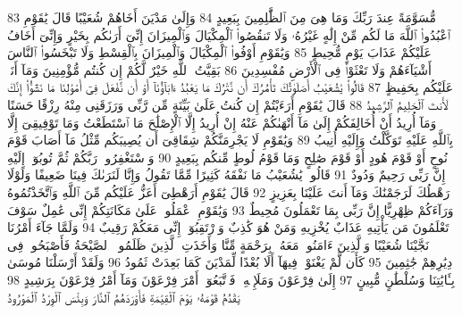 {\tiny\colorbox{cl_aya}{83}} مُّسَوَّمَةً عِندَ رَبِّكَ وَمَا هِىَ مِنَ ٱلظَّٰلِمِينَ بِبَعِيدٍ
{\tiny\colorbox{cl_aya}{84}} وَإِلَىٰ مَدْيَنَ أَخَاهُمْ شُعَيْبًا قَالَ يَٰقَوْمِ ٱعْبُدُوا۟ ٱللَّهَ مَا لَكُم مِّنْ إِلَٰهٍ غَيْرُهُۥ وَلَا تَنقُصُوا۟ ٱلْمِكْيَالَ وَٱلْمِيزَانَ إِنِّىٓ أَرَىٰكُم بِخَيْرٍ وَإِنِّىٓ أَخَافُ عَلَيْكُمْ عَذَابَ يَوْمٍ مُّحِيطٍ
{\tiny\colorbox{cl_aya}{85}} وَيَٰقَوْمِ أَوْفُوا۟ ٱلْمِكْيَالَ وَٱلْمِيزَانَ بِٱلْقِسْطِ وَلَا تَبْخَسُوا۟ ٱلنَّاسَ أَشْيَآءَهُمْ وَلَا تَعْثَوْا۟ فِى ٱلْأَرْضِ مُفْسِدِينَ
{\tiny\colorbox{cl_aya}{86}} بَقِيَّتُ ٱللَّهِ خَيْرٌ لَّكُمْ إِن كُنتُم مُّؤْمِنِينَ وَمَآ أَنَا۠ عَلَيْكُم بِحَفِيظٍ
{\tiny\colorbox{cl_aya}{87}} قَالُوا۟ يَٰشُعَيْبُ أَصَلَوٰتُكَ تَأْمُرُكَ أَن نَّتْرُكَ مَا يَعْبُدُ ءَابَآؤُنَآ أَوْ أَن نَّفْعَلَ فِىٓ أَمْوَٰلِنَا مَا نَشَٰٓؤُا۟ إِنَّكَ لَأَنتَ ٱلْحَلِيمُ ٱلرَّشِيدُ
{\tiny\colorbox{cl_aya}{88}} قَالَ يَٰقَوْمِ أَرَءَيْتُمْ إِن كُنتُ عَلَىٰ بَيِّنَةٍ مِّن رَّبِّى وَرَزَقَنِى مِنْهُ رِزْقًا حَسَنًا وَمَآ أُرِيدُ أَنْ أُخَالِفَكُمْ إِلَىٰ مَآ أَنْهَىٰكُمْ عَنْهُ إِنْ أُرِيدُ إِلَّا ٱلْإِصْلَٰحَ مَا ٱسْتَطَعْتُ وَمَا تَوْفِيقِىٓ إِلَّا بِٱللَّهِ عَلَيْهِ تَوَكَّلْتُ وَإِلَيْهِ أُنِيبُ
{\tiny\colorbox{cl_aya}{89}} وَيَٰقَوْمِ لَا يَجْرِمَنَّكُمْ شِقَاقِىٓ أَن يُصِيبَكُم مِّثْلُ مَآ أَصَابَ قَوْمَ نُوحٍ أَوْ قَوْمَ هُودٍ أَوْ قَوْمَ صَٰلِحٍ وَمَا قَوْمُ لُوطٍ مِّنكُم بِبَعِيدٍ
{\tiny\colorbox{cl_aya}{90}} وَٱسْتَغْفِرُوا۟ رَبَّكُمْ ثُمَّ تُوبُوٓا۟ إِلَيْهِ إِنَّ رَبِّى رَحِيمٌ وَدُودٌ
{\tiny\colorbox{cl_aya}{91}} قَالُوا۟ يَٰشُعَيْبُ مَا نَفْقَهُ كَثِيرًا مِّمَّا تَقُولُ وَإِنَّا لَنَرَىٰكَ فِينَا ضَعِيفًا وَلَوْلَا رَهْطُكَ لَرَجَمْنَٰكَ وَمَآ أَنتَ عَلَيْنَا بِعَزِيزٍ
{\tiny\colorbox{cl_aya}{92}} قَالَ يَٰقَوْمِ أَرَهْطِىٓ أَعَزُّ عَلَيْكُم مِّنَ ٱللَّهِ وَٱتَّخَذْتُمُوهُ وَرَآءَكُمْ ظِهْرِيًّا إِنَّ رَبِّى بِمَا تَعْمَلُونَ مُحِيطٌ
{\tiny\colorbox{cl_aya}{93}} وَيَٰقَوْمِ ٱعْمَلُوا۟ عَلَىٰ مَكَانَتِكُمْ إِنِّى عَٰمِلٌ سَوْفَ تَعْلَمُونَ مَن يَأْتِيهِ عَذَابٌ يُخْزِيهِ وَمَنْ هُوَ كَٰذِبٌ وَٱرْتَقِبُوٓا۟ إِنِّى مَعَكُمْ رَقِيبٌ
{\tiny\colorbox{cl_aya}{94}} وَلَمَّا جَآءَ أَمْرُنَا نَجَّيْنَا شُعَيْبًا وَٱلَّذِينَ ءَامَنُوا۟ مَعَهُۥ بِرَحْمَةٍ مِّنَّا وَأَخَذَتِ ٱلَّذِينَ ظَلَمُوا۟ ٱلصَّيْحَةُ فَأَصْبَحُوا۟ فِى دِيَٰرِهِمْ جَٰثِمِينَ
{\tiny\colorbox{cl_aya}{95}} كَأَن لَّمْ يَغْنَوْا۟ فِيهَآ أَلَا بُعْدًا لِّمَدْيَنَ كَمَا بَعِدَتْ ثَمُودُ
{\tiny\colorbox{cl_aya}{96}} وَلَقَدْ أَرْسَلْنَا مُوسَىٰ بِـَٔايَٰتِنَا وَسُلْطَٰنٍ مُّبِينٍ
{\tiny\colorbox{cl_aya}{97}} إِلَىٰ فِرْعَوْنَ وَمَلَإِي۟هِۦ فَٱتَّبَعُوٓا۟ أَمْرَ فِرْعَوْنَ وَمَآ أَمْرُ فِرْعَوْنَ بِرَشِيدٍ
{\tiny\colorbox{cl_aya}{98}} يَقْدُمُ قَوْمَهُۥ يَوْمَ ٱلْقِيَٰمَةِ فَأَوْرَدَهُمُ ٱلنَّارَ وَبِئْسَ ٱلْوِرْدُ ٱلْمَوْرُودُ
